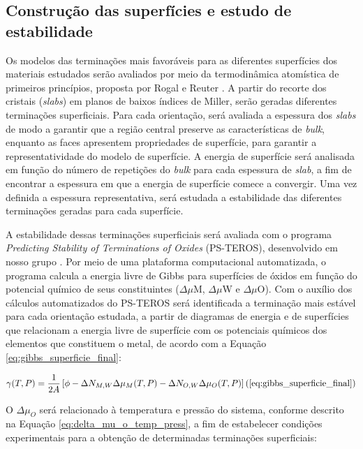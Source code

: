 \subsection{Construção das superfícies e estudo de estabilidade }
Os modelos das terminações mais favoráveis para as diferentes superfícies dos materiais estudados serão avaliados por meio da termodinâmica atomística de primeiros princípios, proposta por Rogal e Reuter \cite{rogal2006}. A partir do recorte dos cristais (\textit{slabs}) em planos de baixos índices de Miller, serão geradas diferentes terminações superficiais. Para cada orientação, será avaliada a espessura dos \textit{slabs} de modo a garantir que a região central preserve as características de \textit{bulk}, enquanto as faces apresentem propriedades de superfície, para garantir a representatividade do modelo de superfície. A energia de superfície será analisada em função do número de repetições do \textit{bulk} para cada espessura de \textit{slab}, a fim de encontrar a espessura em que a energia de superfície comece a convergir. Uma vez definida a espessura representativa, será estudada a estabilidade das diferentes terminações geradas para cada superfície.

A estabilidade dessas terminações superficiais será avaliada com o programa \textit{Predicting Stability of Terminations of Oxides} (PS-TEROS), desenvolvido em nosso grupo \cite{dorini2025accelerating}. Por meio de uma plataforma computacional automatizada, o programa calcula a energia livre de Gibbs para superfícies de óxidos em função do potencial químico de seus constituintes (${\Delta}{\mu}$M, ${\Delta}{\mu}$W e ${\Delta}{\mu}$O). Com o auxílio dos cálculos automatizados do PS-TEROS será identificada a terminação mais estável para cada orientação estudada, a partir de diagramas de energia e de superfícies que relacionam a energia livre de superfície com os potenciais químicos dos elementos que constituem o metal, de acordo com a Equação \ref{eq:gibbs_superficie_final}:

\begin{dmath*}
\gamma(T,P) = \frac{1}{2A} \left[ \phi - \Delta N_{M,W}\Delta \mu_{M}(T,P) - \Delta N_{O,W}\Delta \mu_{O}(T,P) \right]
\hfill (\ref{eq:gibbs_superficie_final})
\end{dmath*}

O ${\Delta}{\mu_O}$ será relacionado à temperatura e pressão do sistema, conforme descrito na Equação \ref{eq:delta_mu_o_temp_press}, a fim de estabelecer condições experimentais para a obtenção de determinadas terminações superficiais:

